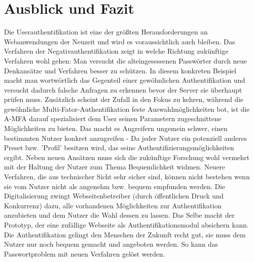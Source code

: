 \chapter{Ausblick und Fazit}
Die Userauthentifikation ist eine der größten Herausforderungen an Webanwendungen der Neuzeit und wird es voraussichtlich auch bleiben. Das Verfahren der Negativauthentifikation zeigt in welche Richtung zukünftige Verfahren wohl gehen: Man versucht die alteingesessenen Passwörter durch neue Denkansätze und Verfahren besser zu schützen. In diesem konkreten Beispiel macht man wortwörtlich das Gegenteil einer gewöhnlichen Authentifikation und versucht dadurch falsche Anfragen zu erkennen bevor der Server sie überhaupt prüfen muss. Zusätzlich scheint der Zufall in den Fokus zu kehren, während die gewöhnliche Multi-Fator-Authentifikation feste Auswahlmöglichkeiten bot, ist die A-MFA darauf spezialisiert dem User seinen Parametern zugeschnittene Möglichkeiten zu bieten. Das macht es Angreifern ungemein schwer, einen bestimmten Nutzer konkret anzugreifen - Da jeder Nutzer ein potenziell anderes Preset bzw. 'Profil' besitzen wird, das seine Authentifizierungsmöglichkeiten ergibt. Neben neuen Ansätzen muss sich die zukünftige Forschung wohl vermehrt mit der Haltung der Nutzer zum Thema Bequemlichkeit widmen. Neuere Verfahren, die aus technischer Sicht sehr sicher sind, können nicht bestehen wenn sie vom Nutzer nicht als angenehm bzw. bequem empfunden werden. Die Digitalisierung zwingt Webseitenbetreiber (durch öffentlichen Druck und Konkurrenz) dazu, alle vorhandenen Möglichkeiten zur Authentifikation anzubieten und dem Nutzer die Wahl dessen zu lassen. Das Selbe macht der Prototyp, der eine zufällige Webseite als Authentifikationsmodul absichern kann. Die Authentifikation gelingt den Menschen der Zukunft recht gut, sie muss dem Nutzer nur noch bequem gemacht und angeboten werden. So kann das Passwortproblem mit neuen Verfahren gelöst werden.
